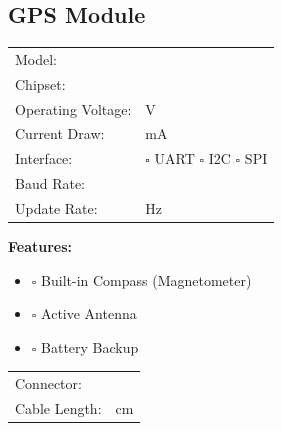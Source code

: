 \documentclass[10pt,letterpaper]{article}
\begin{document}
\subsection*{GPS Module}
\begin{tabularx}{\textwidth}{lX}
Model: & \underline{\hspace{8cm}} \\
Chipset: & \underline{\hspace{6cm}} \\
Operating Voltage: & \underline{\hspace{4cm}} V \\
Current Draw: & \underline{\hspace{4cm}} mA \\
Interface: & $\square$ UART $\square$ I2C $\square$ SPI \\
Baud Rate: & \underline{\hspace{4cm}} \\
Update Rate: & \underline{\hspace{4cm}} Hz \\
\end{tabularx}

\textbf{Features:}
\begin{itemize}[nosep]
\item $\square$ Built-in Compass (Magnetometer)
\item $\square$ Active Antenna
\item $\square$ Battery Backup
\end{itemize}

\begin{tabularx}{\textwidth}{lX}
Connector: & \underline{\hspace{6cm}} \\
Cable Length: & \underline{\hspace{4cm}} cm \\
\end{tabularx}
\end{document}
